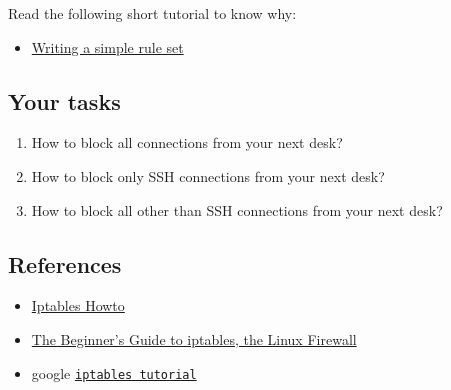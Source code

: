 \documentclass{article} [NO-DEFAULT-PACKAGES] \usepackage{wx672hyperref}
\begin{document}
Read the following short tutorial to know why:
\begin{itemize}
\item \href{http://wiki.centos.org/HowTos/Network/IPTables\#head-724ed81dbcd2b82b5fd3f648142796f3ce60c730}{Writing a simple rule set}
\end{itemize}

\subsection{Your tasks}
\label{sec:org89fab9e}
\begin{enumerate}
\item How to block all connections from your next desk?
\item How to block only SSH connections from your next desk?
\item How to block all other than SSH connections from your next desk?
\end{enumerate}

\subsection{References}
\label{sec:org7b937fa}
\begin{itemize}
\item \href{https://help.ubuntu.com/community/IptablesHowTo}{Iptables Howto}
\item \href{http://www.howtogeek.com/177621/the-beginners-guide-to-iptables-the-linux-firewall/}{The Beginner’s Guide to iptables, the Linux Firewall}
\item google \href{https://www.google.com/\#q\%3Diptables\%20tutorial\&oq\%3Diptables\%20\&aqs\%3Dchrome.2.69i57j0l5.9165j0j7\&sourceid\%3Dchrome\&es\_sm\%3D93\&ie\%3DUTF-8\&qscrl\%3D1}{\texttt{iptables tutorial}}
\end{itemize}
\end{document}
